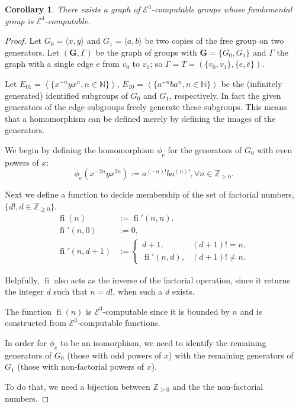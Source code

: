 \documentclass[a4paper]{article}
\newcommand{\grz}[1]{$\mathcal{E}^{#1}$}	%
\newcommand{\ZZ}{\mathbb{Z}}
\newcommand{\recur}[1]{\begin{equation} \begin{split} #1 \end{split} \end{equation}}	%
\theoremstyle{plain}
\newtheorem{corollary}[theorem]{Corollary}
\theoremstyle{definition}
\begin{document}
\begin{corollary}
There exists a graph of \grz{3}-computable groups whose fundamental group is \grz{4}-computable.
\end{corollary}

\begin{proof}
Let $G_0 = \langle x,y \rangle$ and $G_1 = \langle a,b \rangle$  
be two copies of the free group on two generators. Let $(\mathbf{G},\Gamma)$
 be the graph of groups with $\mathbf{G} = \{G_0,G_1\}$ and $\Gamma$ the 
graph
with a single edge $e$ from $v_0$ to $v_1$; so $\Gamma = T = (\{v_0,v_1\},\{e,\bar{e}\})$.

Let $E_{01} = \left \langle \{x^{-n}yx^n, n \in \mathbb{N} \} \right \rangle$, $E_{10} = \left\langle \{ a^{-n}ba^n, n \in \mathbb{N} \} \right\rangle$ be the (infinitely generated) identified subgroups of $G_0$ and $G_1$, respectively. In fact the given generators of the edge subgroups freely generate
these subgroups. This means that a homomorphism can be defined merely
by defining the images of the generators.

We begin by defining the homomorphism $\phi_e$ for the generators of $G_0$ with even powers of $x$:
\[	\phi_{e}(x^{-2n}yx^{2n}) := a^{(-n)!}ba^{(n)!}, \forall n \in \ZZ_{\geq 0}. \]

Next we define a function to decide membership of the set of factorial numbers, $\{d!, d \in \ZZ_{\geq 0}\}$. \recur{
\operatorname{fi}(n) &:= \operatorname{fi}'(n,n).\\
\operatorname{fi}'(n,0) &:= 0, \\
\operatorname{fi}'(n,d+1) &:= 
	\begin{cases} 
		d+1, & (d+1)! = n, \\
		\operatorname{fi}'(n,d), & (d+1)! \neq n.
	\end{cases}
}

Helpfully, $\operatorname{fi}$ also acts as the inverse of the factorial operation, since it returns the integer $d$ such that $n = d!$, when such a $d$ exists.

The function $\operatorname{fi}(n)$ is \grz{3}-computable since it is bounded by $n$ and is constructed from \grz{3}-computable functions.

In order for $\phi_e$ to be an isomorphism, we need to identify the remaining generators of $G_0$ (those with odd powers of $x$) with the remaining generators of $G_1$ (those with non-factorial powers of $x$).

To do that, we need a bijection between $\ZZ_{\geq 0}$ and the the non-factorial numbers.


\end{proof}
\end{document}
